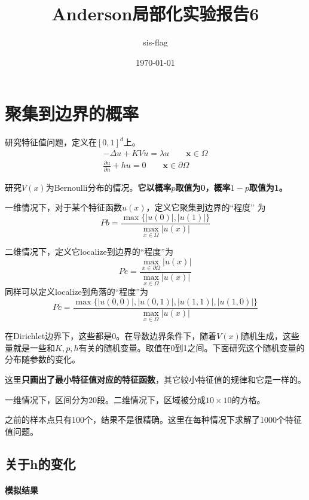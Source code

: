 \documentclass[12pt,a4paper]{article}
\title{Anderson局部化实验报告6}
\author{sis-flag}
\date{\today}
\begin{document}
\section{聚集到边界的概率}

研究特征值问题，定义在$[0,1]^d$上。
\begin{align*}
-\Delta u + K V u = \lambda u \qquad \mathbf{x} \in \Omega \\
\frac{\partial u}{\partial n} + h u = 0 \qquad \mathbf{x} \in \partial \Omega
\end{align*}

研究$V(x)$为Bernoulli分布的情况。\textbf{它以概率$p$取值为0，概率$1-p$取值为1。}

一维情况下，对于某个特征函数$u(x)$，定义它聚集到边界的“程度”
为$$ Pb = \frac{\max\{|u(0)|, |u(1)|\}}{\max_{x \in \Omega} |u(x)|} $$

二维情况下，定义它localize到边界的“程度”为
$$ Pe = \frac{\max_{x \in \partial\Omega} |u(x)|}{\max_{x \in \Omega} |u(x)|} $$
同样可以定义localize到角落的“程度”为
$$ Pc = \frac{\max\{|u(0,0)|, |u(0,1)|, |u(1,1)|, |u(1,0)|\}}{\max_{x \in \Omega} |u(x)|} $$

在Dirichlet边界下，这些都是0。在导数边界条件下，随着$V(x)$随机生成，这些量就是一些和$K,p,h$有关的随机变量。取值在0到1之间。下面研究这个随机变量的分布随参数的变化。

这里\textbf{只画出了最小特征值对应的特征函数}，其它较小特征值的规律和它是一样的。

一维情况下，区间分为$20$段。二维情况下，区域被分成$10 \times 10$的方格。

之前的样本点只有100个，结果不是很精确。这里在每种情况下求解了1000个特征值问题。

\newpage
\subsection{关于h的变化}

\paragraph{模拟结果}
\end{document}
